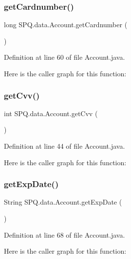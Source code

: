 \subsubsection{\texorpdfstring{get\+Cardnumber()}{getCardnumber()}}
{\footnotesize\ttfamily long S\+P\+Q.\+data.\+Account.\+get\+Cardnumber (\begin{DoxyParamCaption}{ }\end{DoxyParamCaption})}



Definition at line 60 of file Account.\+java.

Here is the caller graph for this function\+:
\mbox{\label{class_s_p_q_1_1data_1_1_account_a6f30fcec03cf6e342b7c6d932166ebb1}} 
\subsubsection{\texorpdfstring{get\+Cvv()}{getCvv()}}
{\footnotesize\ttfamily int S\+P\+Q.\+data.\+Account.\+get\+Cvv (\begin{DoxyParamCaption}{ }\end{DoxyParamCaption})}



Definition at line 44 of file Account.\+java.

Here is the caller graph for this function\+:
\mbox{\label{class_s_p_q_1_1data_1_1_account_a6980881f5f4cd0af58f6ccdc8d6916fc}} 
\subsubsection{\texorpdfstring{get\+Exp\+Date()}{getExpDate()}}
{\footnotesize\ttfamily String S\+P\+Q.\+data.\+Account.\+get\+Exp\+Date (\begin{DoxyParamCaption}{ }\end{DoxyParamCaption})}



Definition at line 68 of file Account.\+java.

Here is the caller graph for this function\+:
\mbox{\label{class_s_p_q_1_1data_1_1_account_a7ac2f177ba411765320259ed3a63b5b2}} 
